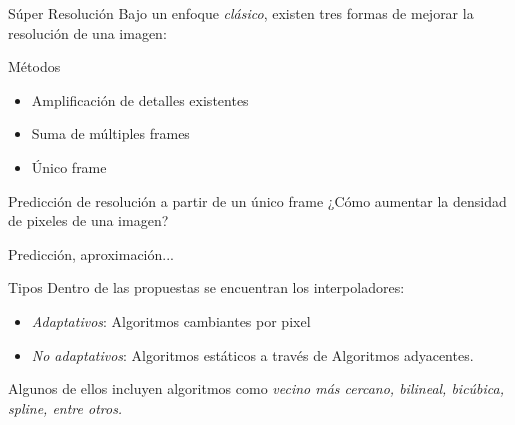 \begin{frame}{Súper Resolución}
    Bajo un enfoque \emph{clásico}, existen tres formas de mejorar la resolución 
    de una imagen:


    \begin{block}{Métodos}
        \begin{itemize}
            \item Amplificación de detalles existentes
            \item Suma de múltiples frames
            \item Único frame
        \end{itemize}
    \end{block}

\end{frame}

\begin{frame}{Predicción de resolución a partir de un único frame}
    ¿Cómo aumentar la densidad de pixeles de una imagen? 

    \pause
    \vspace{0.5cm}
    
    Predicción, aproximación... 
    
    \pause 

    \vspace{0.5cm}

    \begin{block}{Tipos}
        Dentro de las propuestas se encuentran los interpoladores:
        \begin{itemize}
            \item \emph{Adaptativos}: Algoritmos cambiantes por pixel
            \item \emph{No adaptativos}: Algoritmos estáticos a través de Algoritmos
            adyacentes. 
        \end{itemize}
    \end{block}

    Algunos de ellos incluyen algoritmos como \emph{vecino más cercano, bilineal, bicúbica,
    spline, entre otros.}
    
\end{frame}

